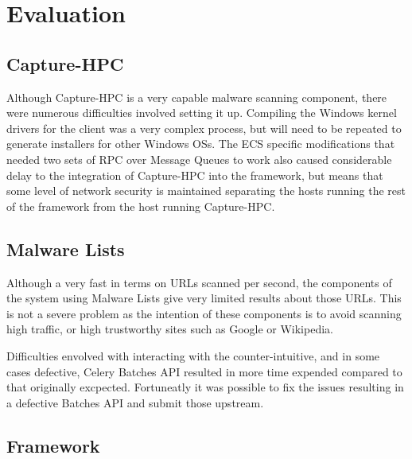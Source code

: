 \section{Evaluation}








\subsection{Capture-HPC}

Although Capture-HPC is a very capable malware scanning component, there were
numerous difficulties involved setting it up. Compiling the Windows kernel
drivers for the client was a very complex process, but will need to be repeated
to generate installers for other Windows OSs. The ECS specific modifications
that needed two sets of RPC over Message Queues to work also caused considerable
delay to the integration of Capture-HPC into the framework, but means that some
level of network security is maintained separating the hosts running the rest of
the framework from the host running Capture-HPC.

\subsection{Malware Lists}
Although a very fast in terms on URLs scanned per second, the components of the system using Malware Lists give very limited results about those URLs. This is not a severe problem as the intention of these components is to avoid scanning high traffic, or high trustworthy sites such as Google or Wikipedia.

Difficulties envolved with interacting with the counter-intuitive, and in some cases defective, Celery Batches API resulted in more time expended compared to that originally excpected. Fortuneatly it was possible to fix the issues resulting in a defective Batches API and submit those upstream.

\subsection{Framework}


